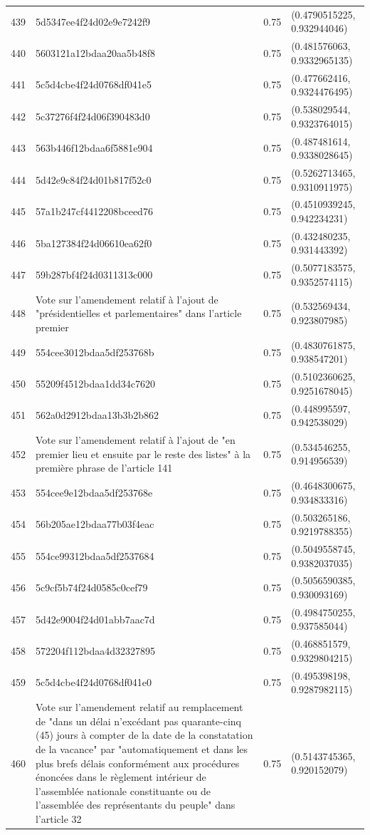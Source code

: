\begin{table}[ht]
\begin{tabular}{rlrl}
  439 & 5d5347ee4f24d02e9e7242f9 & 0.75 & (0.4790515225, 0.932944046) \\ 
  440 & 5603121a12bdaa20aa5b48f8 & 0.75 & (0.481576063, 0.9332965135) \\ 
  441 & 5c5d4cbe4f24d0768df041e5 & 0.75 & (0.477662416, 0.9324476495) \\ 
  442 & 5c37276f4f24d06f390483d0 & 0.75 & (0.538029544, 0.9323764015) \\ 
  443 & 563b446f12bdaa6f5881e904 & 0.75 & (0.487481614, 0.9338028645) \\ 
  444 & 5d42e9c84f24d01b817f52c0 & 0.75 & (0.5262713465, 0.9310911975) \\ 
  445 & 57a1b247cf4412208bceed76 & 0.75 & (0.4510939245, 0.942234231) \\ 
  446 & 5ba127384f24d06610ea62f0 & 0.75 & (0.432480235, 0.931443392) \\ 
  447 & 59b287bf4f24d0311313c000 & 0.75 & (0.5077183575, 0.9352574115) \\ 
  448 & Vote sur l'amendement relatif à l'ajout de "présidentielles et parlementaires" dans l'article premier & 0.75 & (0.532569434, 0.923807985) \\ 
  449 & 554cee3012bdaa5df253768b & 0.75 & (0.4830761875, 0.938547201) \\ 
  450 & 55209f4512bdaa1dd34c7620 & 0.75 & (0.5102360625, 0.9251678045) \\ 
  451 & 562a0d2912bdaa13b3b2b862 & 0.75 & (0.448995597, 0.942538029) \\ 
  452 & Vote sur l'amendement relatif à l'ajout de "en premier lieu et ensuite par le reste des listes" à la première phrase de l'article 141 & 0.75 & (0.534546255, 0.914956539) \\ 
  453 & 554cee9e12bdaa5df253768e & 0.75 & (0.4648300675, 0.934833316) \\ 
  454 & 56b205ae12bdaa77b03f4eac & 0.75 & (0.503265186, 0.9219788355) \\ 
  455 & 554ce99312bdaa5df2537684 & 0.75 & (0.5049558745, 0.9382037035) \\ 
  456 & 5c9cf5b74f24d0585c0cef79 & 0.75 & (0.5056590385, 0.930093169) \\ 
  457 & 5d42e9004f24d01abb7aac7d & 0.75 & (0.4984750255, 0.937585044) \\ 
  458 & 572204f112bdaa4d32327895 & 0.75 & (0.468851579, 0.9329804215) \\ 
  459 & 5c5d4cbe4f24d0768df041e0 & 0.75 & (0.495398198, 0.9287982115) \\ 
  460 & Vote sur l'amendement relatif au remplacement de "dans un délai n’excédant pas quarante-cinq (45) jours à compter de la date de la constatation de la vacance" par "automatiquement et dans les plus brefs délais conformément aux procédures énoncées dans le règlement intérieur de l'assemblée nationale constituante ou de l'assemblée des représentants du peuple" dans l'article 32 & 0.75 & (0.5143745365, 0.920152079) \\ 

\end{tabular}
\end{table}
